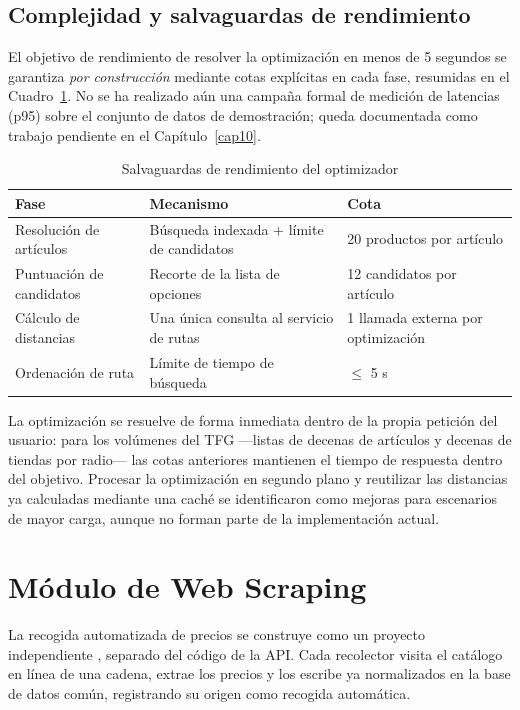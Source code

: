 \subsection{Complejidad y salvaguardas de rendimiento}\label{subsec:rendimiento}

El objetivo de rendimiento de resolver la optimizaci\'on en menos de 5 segundos se garantiza
\emph{por construcci\'on} mediante cotas expl\'icitas en cada fase, resumidas en el
Cuadro~\ref{tab:rendimiento}. No se ha realizado a\'un una campa\~na formal de medici\'on de
latencias (p95) sobre el conjunto de datos de demostraci\'on; queda documentada como trabajo
pendiente en el Cap\'itulo~\ref{cap10}.

\begin{table}[htbp]
\centering
\caption{Salvaguardas de rendimiento del optimizador}
\label{tab:rendimiento}
\small
\begin{tabular}{@{}lll@{}}
\toprule
\textbf{Fase} & \textbf{Mecanismo} & \textbf{Cota} \\
\midrule
Resoluci\'on de art\'iculos & B\'usqueda indexada + l\'imite de candidatos & 20 productos por art\'iculo \\
Puntuaci\'on de candidatos & Recorte de la lista de opciones & 12 candidatos por art\'iculo \\
C\'alculo de distancias & Una \'unica consulta al servicio de rutas & 1 llamada externa por optimizaci\'on \\
Ordenaci\'on de ruta & L\'imite de tiempo de b\'usqueda & $\leq$ 5 s \\
\bottomrule
\end{tabular}
\end{table}

La optimizaci\'on se resuelve de forma inmediata dentro de la propia petici\'on del usuario: para
los vol\'umenes del TFG ---listas de decenas de art\'iculos y decenas de tiendas por radio--- las
cotas anteriores mantienen el tiempo de respuesta dentro del objetivo. Procesar la optimizaci\'on en
segundo plano y reutilizar las distancias ya calculadas mediante una cach\'e se identificaron como
mejoras para escenarios de mayor carga, aunque no forman parte de la implementaci\'on actual.

\section{M\'odulo de Web Scraping}\label{sec:scraping}

La recogida automatizada de precios se construye como un proyecto independiente \cite{scrapy_docs},
separado del c\'odigo de la API. Cada recolector visita el cat\'alogo en l\'inea de una cadena,
extrae los precios y los escribe ya normalizados en la base de datos com\'un, registrando su origen
como recogida autom\'atica.

